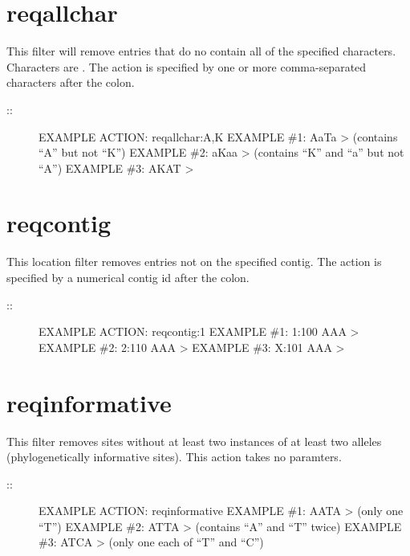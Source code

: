 \documentclass[letterpaper,11pt,english]{sphinxmanual}
\begin{document}
\section{reqallchar}
\label{\detokenize{mvf_filter_modules:reqallchar}}
This filter will remove entries that do no contain all of the specified
characters. Characters are . The action is
specified by one or more comma-separated characters after the colon.
\begin{description}
\item[{::}] \leavevmode
EXAMPLE ACTION: reqallchar:A,K
EXAMPLE \#1: AaTa \textendash{}\textgreater{}  (contains “A” but not “K”)
EXAMPLE \#2: aKaa \textendash{}\textgreater{}  (contains “K” and “a” but not “A”)
EXAMPLE \#3: AKAT \textendash{}\textgreater{} 

\end{description}


\section{reqcontig}
\label{\detokenize{mvf_filter_modules:reqcontig}}
This location filter removes entries not on the specified contig.
The action is specified by a numerical contig id after the colon.
\begin{description}
\item[{::}] \leavevmode
EXAMPLE ACTION: reqcontig:1
EXAMPLE \#1: 1:100 AAA \textendash{}\textgreater{} 
EXAMPLE \#2: 2:110 AAA \textendash{}\textgreater{} 
EXAMPLE \#3: X:101 AAA \textendash{}\textgreater{} 

\end{description}


\section{reqinformative}
\label{\detokenize{mvf_filter_modules:reqinformative}}
This filter removes sites without at least two instances of
at least two alleles (phylogenetically informative sites).
This action takes no paramters.
\begin{description}
\item[{::}] \leavevmode
EXAMPLE ACTION: reqinformative
EXAMPLE \#1: AATA \textendash{}\textgreater{}  (only one “T”)
EXAMPLE \#2: ATTA \textendash{}\textgreater{}  (contains “A” and “T” twice)
EXAMPLE \#3: ATCA \textendash{}\textgreater{}  (only one each of “T” and “C”)

\end{description}
\end{document}
